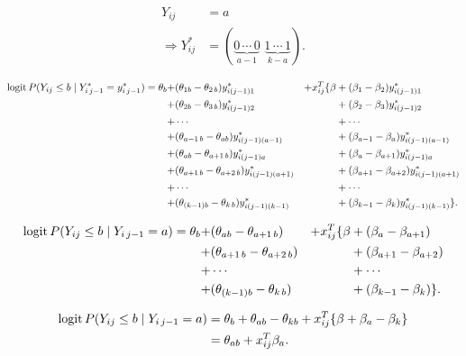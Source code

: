 \documentclass[UTF8,a4paper,10pt]{article}
\begin{document}
\begin{align*}
  Y_{ij} &= a\\
   \Rightarrow  Y_{ij}^* &= (\underset{a-1}{\underbrace{0\,\cdots\,0}} \,\, \underset{k-a}{\underbrace{1\,\cdots\,1}}).
\end{align*}

\begin{align*}
  \operatorname{logit} P(Y_{ij}\leq b\mid Y_{i\,j-1}^* = y_{i\,j-1}^*) 
  = \theta_b + & (\theta_{1b}-\theta_{2\,b})y_{i(j-1)1}^*  &+ x_{ij}^T\{    \beta&+(\beta_{1}-\beta_{2})y_{i(j-1)1}^*\\
  +&(\theta_{2b}-\theta_{3\,b})y_{i(j-1)2}^* &&+ (\beta_{2}-\beta_{3})y_{i(j-1)2}^*\\
  +&\cdots  &&+\cdots\\
  +&(\theta_{a-1\,b}-\theta_{ab})y_{i(j-1)(a-1)}^* &&+(\beta_{a-1}-\beta_{a})y_{i(j-1)(a-1)}^*\\
  +&(\theta_{ab}-\theta_{a+1\,b})y_{i(j-1)a}^* && +(\beta_{a}-\beta_{a+1})y_{i(j-1)a}^*\\
  +&(\theta_{a+1\,b}-\theta_{a+2\,b})y_{i(j-1)(a+1)}^* && +(\beta_{a+1}-\beta_{a+2})y_{i(j-1)(a+1)}^*\\
  +&\cdots &&+\cdots\\
  +&(\theta_{(k-1)b}-\theta_{k\,b})y_{i(j-1)(k-1)}^* && +(\beta_{k-1}-\beta_{k})y_{i(j-1)(k-1)}^*\}.
\end{align*}

\begin{align*}
  \operatorname{logit} P(Y_{ij}\leq b\mid Y_{i \, j-1} = a)  
  =\theta_b +&(\theta_{ab}-\theta_{a+1\,b}) & + x_{ij}^T\{    \beta& +(\beta_{a}-\beta_{a+1})\\
  +&(\theta_{a+1\,b}-\theta_{a+2\,b}) && +(\beta_{a+1}-\beta_{a+2})\\
  +&\cdots &&+\cdots\\
  +&(\theta_{(k-1)b}-\theta_{k\,b}) && +(\beta_{k-1}-\beta_{k})\}.
\end{align*}

\begin{align*}
  \operatorname{logit} P(Y_{ij}\leq b\mid Y_{i \, j-1} = a)  
  &=\theta_b +\theta_{ab}-\theta_{kb} + x_{ij}^T\{\beta +\beta_{a}-\beta_{k}\}\\
  &=\theta_{ab}+x_{ij}^T\beta_{a}.
\end{align*}


\pagebreak
\end{document}

